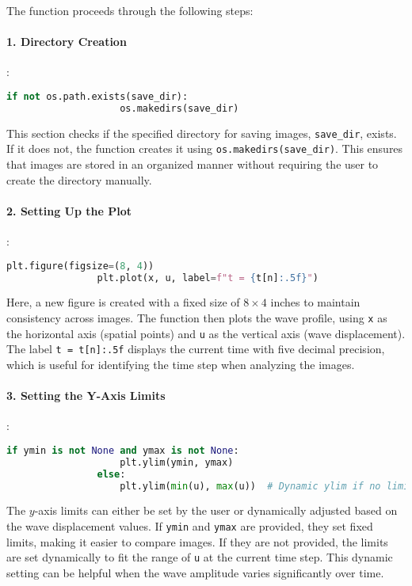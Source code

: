 \documentclass{article}
\begin{document}
			The function proceeds through the following steps:
			
			\paragraph{1. Directory Creation}
			:
			\begin{lstlisting}[language=Python]
				if not os.path.exists(save_dir):
					os.makedirs(save_dir)
			\end{lstlisting}
			This section checks if the specified directory for saving images, \texttt{save\_dir}, exists. If it does not, the function creates it using \texttt{os.makedirs(save\_dir)}. This ensures that images are stored in an organized manner without requiring the user to create the directory manually.
			
			\paragraph{2. Setting Up the Plot}
			:
			\begin{lstlisting}[language=Python]
				plt.figure(figsize=(8, 4))
				plt.plot(x, u, label=f"t = {t[n]:.5f}")
			\end{lstlisting}
			Here, a new figure is created with a fixed size of \(8 \times 4\) inches to maintain consistency across images. The function then plots the wave profile, using \texttt{x} as the horizontal axis (spatial points) and \texttt{u} as the vertical axis (wave displacement). The label \texttt{t = t[n]:.5f} displays the current time with five decimal precision, which is useful for identifying the time step when analyzing the images.
			
			
			\paragraph{3. Setting the Y-Axis Limits}
			:
			\begin{lstlisting}[language=Python]
				if ymin is not None and ymax is not None:
					plt.ylim(ymin, ymax)
				else:
					plt.ylim(min(u), max(u))  # Dynamic ylim if no limits are provided
			\end{lstlisting}
			The $y$-axis limits can either be set by the user or dynamically adjusted based on the wave displacement values. If \texttt{ymin} and \texttt{ymax} are provided, they set fixed limits, making it easier to compare images. If they are not provided, the limits are set dynamically to fit the range of \texttt{u} at the current time step. This dynamic setting can be helpful when the wave amplitude varies significantly over time.
			
\end{document}
